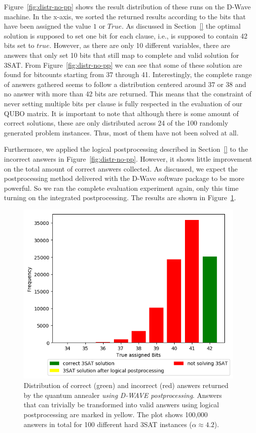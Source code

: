 Figure~\ref{fig:distr-no-pp} shows the result distribution of these runs on the D-Wave machine. In the x-axis, we sorted the returned results according to the bits that have been assigned the value $1$ or $\textit{True}$. As discussed in Section~\ref{} the optimal solution is supposed to set one bit for each clause, i.e., is supposed to contain 42 bits set to $\textit{true}$. However, as there are only 10 different variables, there are answers that only set 10 bits that still map to complete and valid solution for 3SAT. From Figure~\ref{fig:distr-no-pp} we can see that some of these solution are found for bitcounts starting from 37 through 41. Interestingly, the complete range of answers gathered seems to follow a distribution centered around $37$ or $38$ and no answer with more than 42 bits are returned. This means that the constraint of never setting multiple bits per clause is fully respected in the evaluation of our QUBO matrix. It is important to note that although there is some amount of correct solutions, these are only distributed across 24 of the 100 randomly generated problem instances. Thus,  most of them have not been solved at all.

Furthermore, we applied the logical postprocessing described in Section~\ref{} to the incorrect answers in Figure~\ref{fig:distr-no-pp}. However, it shows little improvement on the total amount of correct answers collected. As discussed, we expect the postprocessing method delivered with the D-Wave software package to be more powerful. So we ran the complete evaluation experiment again, only this time turning on the integrated postprocessing. The results are shown in Figure~\ref{fig:distr-yes-pp}.

\begin{figure}
\centering
\includegraphics[width=.8\textwidth]{../material_2/Plots/42_4_2_opt_engl_color_mit_transform.png}
\caption{Distribution of correct (green) and incorrect (red) answers returned by the quantum annealer \emph{using D-WAVE postprocessing}. Answers that can trivially be transformed into valid answers using logical postprocessing are marked in yellow. The plot shows 100,000 answers in total for 100 different hard 3SAT instances ($\alpha \approx 4.2$).}
\label{fig:distr-yes-pp}
\end{figure}

